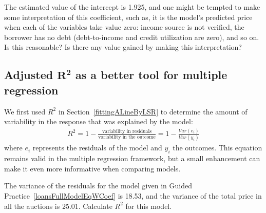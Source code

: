 \begin{exercisewrap}
\begin{nexercise}
The estimated value of the intercept is 1.925, and one might
be tempted to make some interpretation of this coefficient,
such as, it is the model's predicted price when each of the
variables take value zero: income source is not verified,
the borrower has no debt (debt-to-income and credit
utilization are zero), and so on.
Is this reasonable?
Is there any value gained by making this
interpretation?\footnotemark
\end{nexercise}
\end{exercisewrap}


\subsection[Adjusted $R^2$ as a better tool
    for multiple regression]
    {Adjusted $\pmb{R^2}$ as a better tool
        for multiple regression}


We first used $R^2$ in Section~\ref{fittingALineByLSR}
to determine the amount of variability in the response
that was explained by the model:
\begin{align*}
R^2 =
    1 - \frac{\text{variability in residuals}}
        {\text{variability in the outcome}}
	= 1 - \frac{Var(e_i)}{Var(y_i)}
\end{align*}
where $e_i$ represents the residuals of the model and
$y_i$ the outcomes.
This equation remains valid in the multiple regression
framework, but a small enhancement can make it even
more informative when comparing models.

\begin{exercisewrap}
\begin{nexercise}
\label{computeUnadjR2ForFullLoansModel}%
The variance of the residuals for the model given in
Guided Practice~\ref{loansFullModelEqWCoef}
is 18.53, and the variance of the total price in all
the auctions is 25.01.
Calculate $R^2$ for this model.\footnotemark
\end{nexercise}
\end{exercisewrap}

